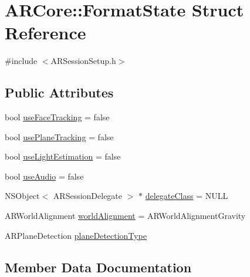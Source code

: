 \hypertarget{struct_a_r_core_1_1_format_state}{}\section{A\+R\+Core\+:\+:Format\+State Struct Reference}
\label{struct_a_r_core_1_1_format_state}


{\ttfamily \#include $<$A\+R\+Session\+Setup.\+h$>$}

\subsection*{Public Attributes}
\begin{DoxyCompactItemize}
\item 
bool \hyperlink{struct_a_r_core_1_1_format_state_aa0a60606a98ec7d4cbd082904b3d4fc1}{use\+Face\+Tracking} = false
\item 
bool \hyperlink{struct_a_r_core_1_1_format_state_a3ed73d33c14ba54c0503f78100a527a5}{use\+Plane\+Tracking} = false
\item 
bool \hyperlink{struct_a_r_core_1_1_format_state_a2d8528cbe8eb9cbc8c1367081eb215d8}{use\+Light\+Estimation} = false
\item 
bool \hyperlink{struct_a_r_core_1_1_format_state_aad1419c4a9db8a4384525c3501013893}{use\+Audio} = false
\item 
N\+S\+Object$<$ A\+R\+Session\+Delegate $>$ $\ast$ \hyperlink{struct_a_r_core_1_1_format_state_a2ac08b9efa1d91b0a5a431e3d0a73aaa}{delegate\+Class} = N\+U\+LL
\item 
A\+R\+World\+Alignment \hyperlink{struct_a_r_core_1_1_format_state_ab2a8b009f4af119e4c3ac45553e7e579}{world\+Alignment} = A\+R\+World\+Alignment\+Gravity
\item 
A\+R\+Plane\+Detection \hyperlink{struct_a_r_core_1_1_format_state_a6dd9d1dd804e9765309d88c5c1447449}{plane\+Detection\+Type}
\end{DoxyCompactItemize}


\subsection{Member Data Documentation}
\mbox{\label{struct_a_r_core_1_1_format_state_a2ac08b9efa1d91b0a5a431e3d0a73aaa}} 
